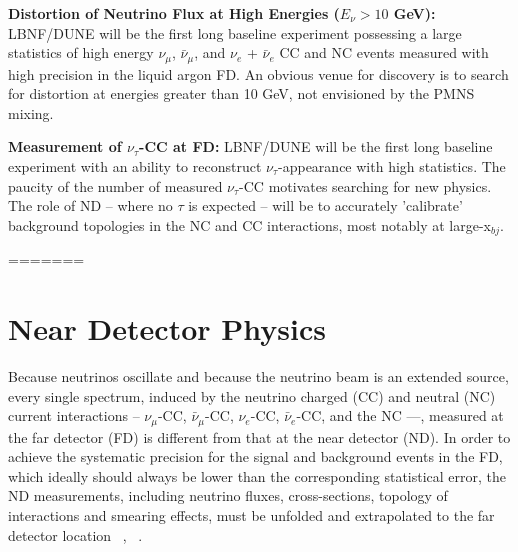 \vspace{0.25cm} 
\noindent 
{\bf Distortion of Neutrino Flux at High Energies ($E_\nu > 10$ GeV):} 
LBNF/DUNE will be the first long baseline experiment possessing a large 
statistics of high energy $\nu_\mu$,  $\bar \nu_\mu$, and $\nu_e$ + $\bar \nu_e$ CC and NC events 
measured with high precision in the liquid argon FD. An obvious venue for discovery is to 
search for distortion at energies greater than 10 GeV, not envisioned by the 
PMNS mixing. 


\vspace{0.25cm} 
\noindent 
{\bf Measurement of $\nu_\tau$-CC at FD:} 
LBNF/DUNE will be the first long baseline experiment with an ability to 
reconstruct $\nu_\tau$-appearance with high statistics. The paucity of the number of measured 
$\nu_\tau$-CC motivates searching for new physics. 
The role of ND -- where no $\tau$ is expected -- will be to accurately 'calibrate' background topologies 
in the NC and CC interactions, most notably at large-x$_{bj}$. 



=======

\chapter{Near Detector Physics}
\label{ch:physics-nd}

Because neutrinos oscillate and because the neutrino beam is an extended  source, every single 
spectrum,  induced by the neutrino charged (CC) and neutral (NC) current interactions -- $\nu_\mu$-CC, 
$\bar \nu_\mu$-CC, $\nu_e$-CC, $\bar \nu_e$-CC, and the NC ---, measured at the far detector (FD)  is different from that at the near 
detector (ND). 
In order to achieve the systematic precision for the signal and background events  in the FD,  
which ideally should always be lower than the corresponding statistical error, the ND 
measurements,  including neutrino fluxes,  cross-sections, topology of 
interactions and smearing effects, must be unfolded and extrapolated to the far detector location 
~\cite{ND-REQ1}, ~\cite{ND-REQ2}. 


